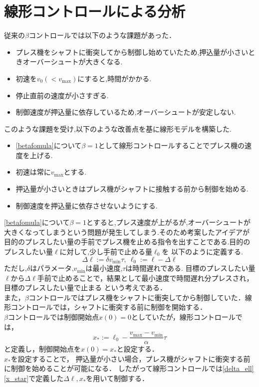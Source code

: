 \documentclass [dvipdfmx] {jsarticle}
\numberwithin{equation}{section}
\theoremstyle{definition} %
\theoremstyle{definition} %
\begin{document}
\section{線形コントロールによる分析}
従来の$\beta$コントロールでは以下のような課題があった．
\begin{itemize}
    \item プレス機をシャフトに衝突してから制御し始めていたため,押込量が小さいときオーバーシュートが大きくなる.
    \item 初速を$v_0(<v_{\max})$にすると,時間がかかる.
    \item 停止直前の速度が小さすぎる.
    \item 制御速度が押込量に依存しているため,オーバーシュートが安定しない.
\end{itemize}
このような課題を受け,以下のような改善点を基に線形モデルを構築した.
\begin{itemize}
    \item \eqref{betafomula}について$\beta=1$として線形コントロールすることでプレス機の速度を上げる. 
    \item 初速は常に$v_{\max}$とする.
    \item 押込量が小さいときはプレス機がシャフトに接触する前から制御を始める.
    \item 制御速度を押込量に依存させないようにする.
\end{itemize}
\eqref{betafomula}について$\beta=1$とすると,プレス速度が上がるが,オーバーシュートが大きくなってしまうという問題が発生してしまう.そのため考案したアイデアが
目的のプレスしたい量の手前でプレス機を止める指令を出すことである.目的のプレスしたい量$\ell$に対して,少し手前で止める量$\ell_0$を
以下のように定義する.
\begin{equation}\label{delta_ell}
    \Delta\ell :=\delta v_{\min}\tau,\ \ell_0:=\ell-\Delta\ell
\end{equation}
ただし,$\delta$はパラメータ,$v_{\min}$は最小速度,$\tau$は時間遅れである.
目標のプレスしたい量$\ell$から$\Delta\ell$手前で止めることで，結果として最小速度で時間遅れ分プレスされ，目標のプレスしたい量で止まる
という考えである．\\
また，$\beta$コントロールではプレス機をシャフトに衝突してから制御していた．線形コントロールでは，シャフトに衝突する前に制御を開始する．\\
$\beta$コントロールでは制御開始点$x(0)=0$としていたが，線形コントロールでは，
\begin{equation}\label{x_star}
    x_\ast:=\ell_0-\displaystyle\frac{v_{\max}-v_{\min}}{\alpha}\tau
\end{equation}
と定義し，制御開始点を$x(0)=x_\ast$と設定する．\\
$x_\ast$を設定することで，
押込量が小さい場合，プレス機がシャフトに衝突する前に制御を始めることが可能になる．
したがって線形コントロールでは\eqref{delta_ell}\eqref{x_star}で定義した$\Delta\ell , x_\ast$を用いて制御する．
\end{document}
